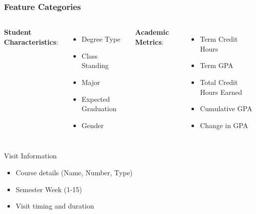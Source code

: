 \documentclass{beamer}
\begin{document}
\begin{frame}
\frametitle{Feature Categories}
    \begin{columns}
        \textbf{Student Characteristics}:
            \begin{itemize}
            \item Degree Type
            \item Class Standing
            \item Major
            \item Expected Graduation
            \item Gender
            \end{itemize}
            
        \textbf{Academic Metrics}:
            \begin{itemize}
            \item Term Credit Hours
            \item Term GPA
            \item Total Credit Hours Earned
            \item Cumulative GPA
            \item Change in GPA
            \end{itemize}
    \end{columns}

    \begin{block}{Visit Information}
        \begin{itemize}
        \item Course details (Name, Number, Type)
        \item Semester Week (1-15)
        \item Visit timing and duration
        \end{itemize}
    \end{block}
\end{frame}
\end{document}
